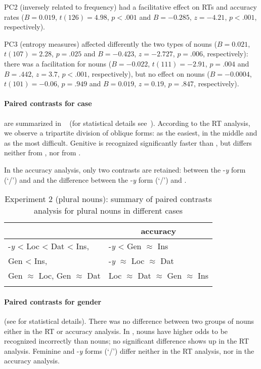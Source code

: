 \documentclass[output=paper, modfonts,newtxmath,hidelinks]{langscibook}
\begin{document}
PC2 (inversely related to frequency) had a facilitative effect on RTs and accuracy rates ($B= 0.019$, $t(126)= 4.98$, $p< .001$ and $B = -0.285$, $z= -4.21$, $p< .001$, respectively). 

PC3 (entropy measures) affected differently the two types of nouns ($B= 0.021$, $t(107)= 2.28$, $p= .025$ and $B = -0.423$, $z= -2.727$, $p= .006$, respectively): there was a facilitation for  nouns ($B= -0.022$, $t(111)= -2.91$, $p= .004$ and $B= .442$, $z= 3.7$, $p< .001$, respectively), but no effect on  nouns ($B= -0.0004$, $t(101)= -0.06$, $p= .949$ and $B= 0.019$, $z= 0.19$, $p= .847$, respectively).

\paragraph*{Paired contrasts for case} are summarized in ~ (for statistical details see~). According to the RT analysis, we observe a tripartite division of oblique forms:  as the easiest,  in the middle and  as the most difficult. Genitive is recognized significantly faster than , but differs neither from , nor from . 

In the accuracy analysis, only two contrasts are retained: between the -\textit{y} form (`\nomm/\accc') and  and the difference between the -\textit{y} form (`\nomm/\accc') and .

\begin{table}
    \centering
	\caption{Experiment 2 (plural nouns): summary of paired contrasts analysis for plural nouns in different cases}
    \label{tab:casePlHierarchy}
    \begin{tabular}{*{2}l}
    \lsptoprule
    \multicolumn{1}{c}{RTs}	&	\multicolumn{1}{c}{accuracy}\\
    \midrule
    -\textit{y}	< Loc < Dat < Ins,	&	-\textit{y} < Gen $\approx$ Ins \\
    Gen < Ins,	&	-\textit{y} $\approx$ Loc $\approx$ Dat\\
    Gen $\approx$ Loc, Gen $\approx$ Dat & Loc $\approx$	Dat $\approx$ Gen $\approx$  Ins\\
    \lspbottomrule
    \end{tabular}
\end{table}    

\paragraph*{Paired contrasts for gender} (see  for statistical details). There was no difference between two groups of nouns either in the RT or accuracy analysis. In ,   nouns have higher odds to be recognized incorrectly than  nouns; no significant difference shows up in the RT analysis. Feminine and  -\textit{y} forms (`\nomm/\accc') differ neither in the RT analysis, nor in the accuracy analysis. 
\end{document}
